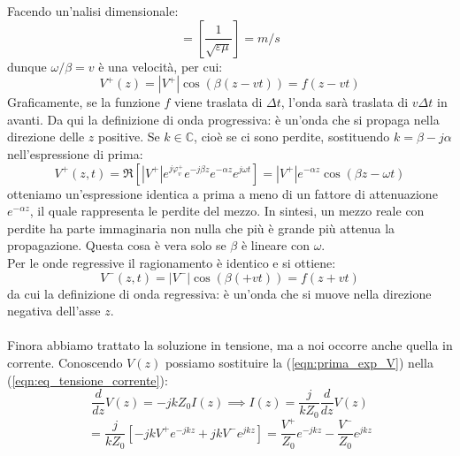 \documentclass{book}
\begin{document}
        Facendo un'nalisi dimensionale:
        \begin{equation}
            [\frac{\omega}{\beta} = \frac{\omega}{\omega \sqrt{\varepsilon \mu}}] = [\frac{1}{\sqrt{\varepsilon \mu}}] = m/s
        \end{equation}
        dunque $\omega/\beta=v$ è una velocità, per cui:
        \begin{equation}
            V^{+}(z)=|V^{+}|\cos(\beta(z-vt)) = f(z-vt)
        \end{equation}
        Graficamente, se la funzione $f$ viene traslata di $\Delta t$, l'onda sarà traslata di $v \Delta t$ in avanti. Da qui
        la definizione di onda progressiva: è un'onda che si propaga nella direzione delle $z$ positive.
        Se $k \in \mathbb{C}$, cioè se ci sono perdite, sostituendo $k=\beta-j\alpha$ nell'espressione di prima:
        \begin{equation}
            V^{+}(z,t)=\Re[|V^{+}|e^{j \varphi_{v} ^{+}}e^{-j \beta z}e^{-\alpha z}e^{j \omega t}]= |V^{+}|e^{-\alpha z}\cos(\beta z-\omega t)
        \end{equation}
        otteniamo un'espressione identica a prima a meno di un fattore di attenuazione $e^{-\alpha z}$, il quale rappresenta le perdite del mezzo. In sintesi,
        un mezzo reale con perdite ha parte immaginaria non nulla che più è grande più attenua la propagazione. Questa cosa è vera solo se $\beta$ è lineare con $\omega$.
        \\ 
        Per le onde regressive il ragionamento è identico e si ottiene:
        \begin{equation}
            V^{-}(z,t)=|V^{-}|\cos(\beta(+vt))=f(z+vt)
        \end{equation}
        da cui la definizione di onda regressiva: è un'onda che si muove nella direzione negativa dell'asse $z$.
        \\ \\
        Finora abbiamo trattato la soluzione  in tensione, ma a noi occorre anche quella in corrente. Conoscendo
        $V(z)$ possiamo sostituire la (\ref{eqn:prima_exp_V}) nella (\ref{eqn:eq_tensione_corrente}):
        \begin{equation}
            \frac{d}{dz}V(z)=-jkZ_{0}I(z) \implies I(z)=\frac{j}{kZ_{0}}\frac{d}{dz}V(z)
        \end{equation}
        \begin{equation}
            = \frac{j}{kZ_{0}}[-j k V^{+}e^{-jkz}+jkV^{-}e^{jkz}] = \frac{V^{+}}{Z_{0}}e^{-jkz}-\frac{V^{-}}{Z_{0}}e^{jkz}
        \end{equation}
\end{document}
